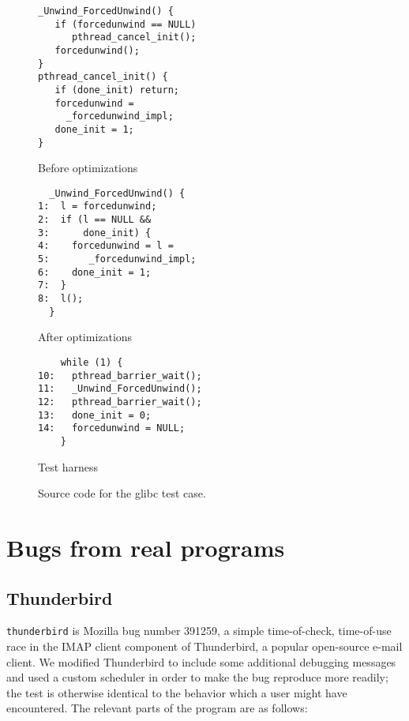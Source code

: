 \begin{figure*}
  \begin{subfloat}
    \begin{minipage}{52mm}
\begin{verbatim}
_Unwind_ForcedUnwind() {
   if (forcedunwind == NULL)
      pthread_cancel_init();
   forcedunwind();
}
pthread_cancel_init() {
   if (done_init) return;
   forcedunwind =
     _forcedunwind_impl;
   done_init = 1;
}
\end{verbatim}
    \end{minipage}
    \caption{Before optimizations}
  \end{subfloat}
  \begin{subfloat}
    \begin{minipage}{52mm}
\begin{verbatim}
  _Unwind_ForcedUnwind() {
1:  l = forcedunwind;
2:  if (l == NULL &&
3:      done_init) {
4:    forcedunwind = l =
5:       _forcedunwind_impl;
6:    done_init = 1;
7:  }
8:  l();
  }
\end{verbatim}
    \end{minipage}
    \caption{After optimizations}
  \end{subfloat}
  \begin{subfloat}
    \begin{minipage}{35mm}
\begin{verbatim}
    while (1) {
10:   pthread_barrier_wait();
11:   _Unwind_ForcedUnwind();
12:   pthread_barrier_wait();
13:   done_init = 0;
14:   forcedunwind = NULL;
    }
\end{verbatim}
    \end{minipage}
    \caption{Test harness}
  \end{subfloat}
  \label{fig:glibc}
  \caption{Source code for the glibc test case.}
\end{figure*}

\section{Bugs from real programs}

\subsection{Thunderbird}


\verb|thunderbird| is Mozilla bug number
391259\cite{thunderbird39125}, a simple time-of-check, time-of-use
race in the IMAP client component of Thunderbird, a popular
open-source e-mail client.  We modified Thunderbird to include some
additional debugging messages and used a custom scheduler in order to
make the bug reproduce more readily; the test is otherwise identical
to the behavior which a user might have encountered.  The relevant
parts of the program are as follows:

